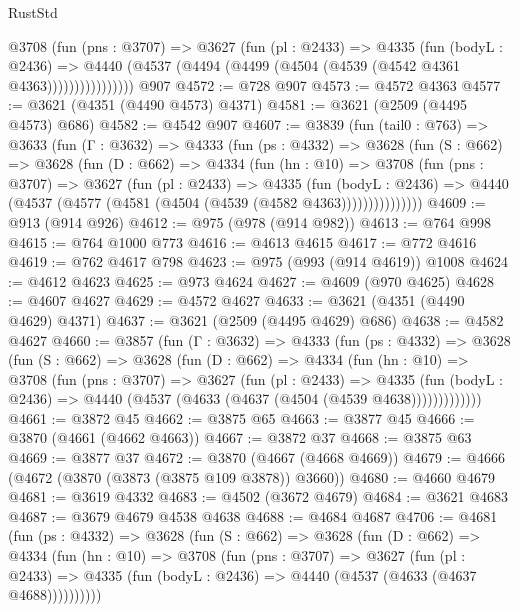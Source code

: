 \begin{lexlean}{RustStd}
\begin{coremodule}
                @3708
                  (fun (pns : @3707) =>
                  @3627
                    (fun (pl : @2433) =>
                    @4335
                      (fun (bodyL : @2436) =>
                      @4440 (@4537 (@4494 (@4499 (@4504 (@4539 (@4542 @4361 @4363))))))))))))))))
    @907
@4572 := @728 @907
@4573 := @4572 @4363
@4577 := @3621 (@4351 (@4490 @4573) @4371)
@4581 := @3621 (@2509 (@4495 @4573) @686)
@4582 := @4542 @907
@4607 := @3839
    (fun (tail0 : @763) =>
    @3633
      (fun (Γ : @3632) =>
      @4333
        (fun (ps : @4332) =>
        @3628
          (fun (S : @662) =>
          @3628
            (fun (D : @662) =>
            @4334
              (fun (hn : @10) =>
              @3708
                (fun (pns : @3707) =>
                @3627
                  (fun (pl : @2433) =>
                  @4335
                    (fun (bodyL : @2436) =>
                    @4440 (@4537 (@4577 (@4581 (@4504 (@4539 (@4582 @4363)))))))))))))))
@4609 := @913 (@914 @926)
@4612 := @975 (@978 (@914 @982))
@4613 := @764 @998
@4615 := @764 @1000 @773
@4616 := @4613 @4615
@4617 := @772 @4616
@4619 := @762 @4617 @798
@4623 := @975 (@993 (@914 @4619)) @1008
@4624 := @4612 @4623
@4625 := @973 @4624
@4627 := @4609 (@970 @4625)
@4628 := @4607 @4627
@4629 := @4572 @4627
@4633 := @3621 (@4351 (@4490 @4629) @4371)
@4637 := @3621 (@2509 (@4495 @4629) @686)
@4638 := @4582 @4627
@4660 := @3857
    (fun (Γ : @3632) =>
    @4333
      (fun (ps : @4332) =>
      @3628
        (fun (S : @662) =>
        @3628
          (fun (D : @662) =>
          @4334
            (fun (hn : @10) =>
            @3708
              (fun (pns : @3707) =>
              @3627
                (fun (pl : @2433) =>
                @4335
                  (fun (bodyL : @2436) =>
                  @4440 (@4537 (@4633 (@4637 (@4504 (@4539 @4638)))))))))))))
@4661 := @3872 @45
@4662 := @3875 @65
@4663 := @3877 @45
@4666 := @3870 (@4661 (@4662 @4663))
@4667 := @3872 @37
@4668 := @3875 @63
@4669 := @3877 @37
@4672 := @3870 (@4667 (@4668 @4669))
@4679 := @4666 (@4672 (@3870 (@3873 (@3875 @109 @3878)) @3660))
@4680 := @4660 @4679
@4681 := @3619 @4332
@4683 := @4502 (@3672 @4679)
@4684 := @3621 @4683
@4687 := @3679 @4679 @4538 @4638
@4688 := @4684 @4687
@4706 := @4681
    (fun (ps : @4332) =>
    @3628
      (fun (S : @662) =>
      @3628
        (fun (D : @662) =>
        @4334
          (fun (hn : @10) =>
          @3708
            (fun (pns : @3707) =>
            @3627
              (fun (pl : @2433) =>
              @4335 (fun (bodyL : @2436) => @4440 (@4537 (@4633 (@4637 @4688))))))))))

\end{coremodule}
\end{lexlean}
